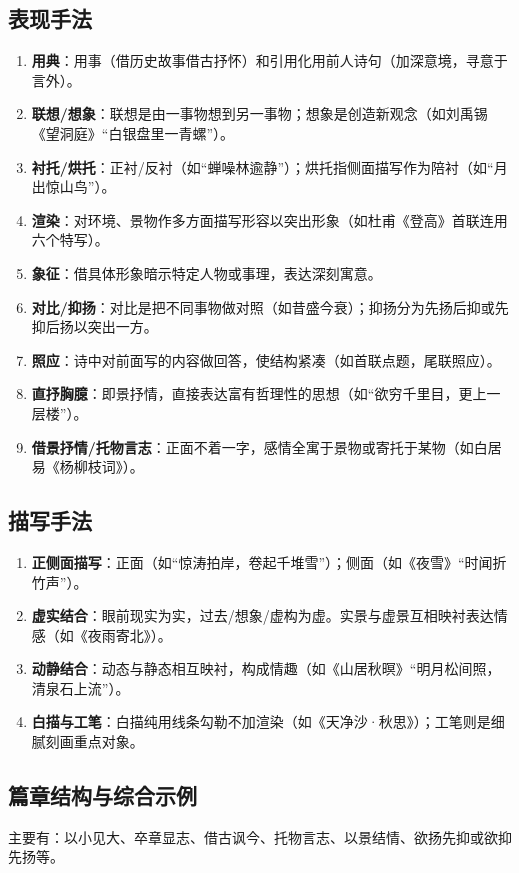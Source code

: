 \documentclass[11pt, a4paper]{ctexart}
\begin{document}
\subsection{表现手法}
\begin{enumerate}
    \item \textbf{用典}：用事（借历史故事借古抒怀）和引用化用前人诗句（加深意境，寻意于言外）。
    \item \textbf{联想/想象}：联想是由一事物想到另一事物；想象是创造新观念（如刘禹锡《望洞庭》“白银盘里一青螺”）。
    \item \textbf{衬托/烘托}：正衬/反衬（如“蝉噪林逾静”）；烘托指侧面描写作为陪衬（如“月出惊山鸟”）。
    \item \textbf{渲染}：对环境、景物作多方面描写形容以突出形象（如杜甫《登高》首联连用六个特写）。
    \item \textbf{象征}：借具体形象暗示特定人物或事理，表达深刻寓意。
    \item \textbf{对比/抑扬}：对比是把不同事物做对照（如昔盛今衰）；抑扬分为先扬后抑或先抑后扬以突出一方。
    \item \textbf{照应}：诗中对前面写的内容做回答，使结构紧凑（如首联点题，尾联照应）。
    \item \textbf{直抒胸臆}：即景抒情，直接表达富有哲理性的思想（如“欲穷千里目，更上一层楼”）。
    \item \textbf{借景抒情/托物言志}：正面不着一字，感情全寓于景物或寄托于某物（如白居易《杨柳枝词》）。
\end{enumerate}

\subsection{描写手法}
\begin{enumerate}
    \item \textbf{正侧面描写}：正面（如“惊涛拍岸，卷起千堆雪”）；侧面（如《夜雪》“时闻折竹声”）。
    \item \textbf{虚实结合}：眼前现实为实，过去/想象/虚构为虚。实景与虚景互相映衬表达情感（如《夜雨寄北》）。
    \item \textbf{动静结合}：动态与静态相互映衬，构成情趣（如《山居秋暝》“明月松间照，清泉石上流”）。
    \item \textbf{白描与工笔}：白描纯用线条勾勒不加渲染（如《天净沙·秋思》）；工笔则是细腻刻画重点对象。
\end{enumerate}

\subsection{篇章结构与综合示例}
主要有：以小见大、卒章显志、借古讽今、托物言志、以景结情、欲扬先抑或欲抑先扬等。
\end{document}

